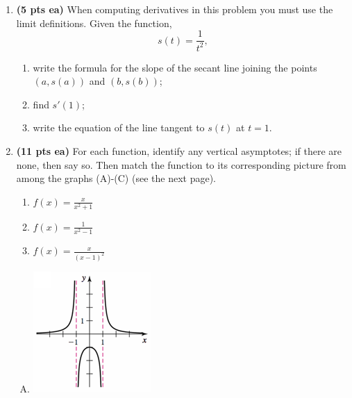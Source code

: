 \documentclass[12pt]{article}
\begin{document}
\begin{enumerate}
\newpage
\item {\bf (5 pts ea)} When computing derivatives in this problem you must use the limit definitions.  Given the function,
\[s(t)=\frac{1}{t^2},\]
	\begin{enumerate}
	\item write the formula for the slope of the secant line joining the points $(a,s(a))$ and $(b,s(b))$;
	\vspace{14pc}
	
	\item find $s'(1)$;
	\vspace{14pc}
	
	\item write the equation of the line tangent to $s(t)$ at $t=1$.
	\end{enumerate}
	
\newpage
\item {\bf (11 pts ea)} For each function, identify any vertical asymptotes; if there are none, then say so.  Then match the function to its corresponding picture from among the graphs (A)-(C) (see the next page).  
\begin{enumerate}
	\item $f(x)=\frac{x}{x^2+1}$
	\vspace{14pc}
	
	\item $f(x)=\frac{1}{x^2-1}$
	\vspace{15pc}
	
	\item $f(x)=\frac{x}{(x-1)^2}$
	\vspace{15pc}

\end{enumerate}	
\newpage
\begin{enumerate}[(A)]\centering
	\item \includegraphics[scale=1.3]{exam1asec2p4B}\hspace{3pc}
	\vspace{3pc}
	

\end{enumerate}
\end{enumerate}
\end{document}
